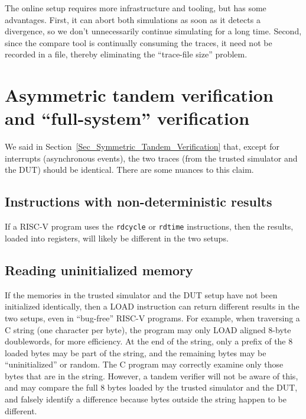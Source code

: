 The online setup requires more infrastructure and tooling, but has
some advantages.  First, it can abort both simulations as soon as it
detects a divergence, so we don't unnecessarily continue simulating
for a long time.  Second, since the compare tool is continually
consuming the traces, it need not be recorded in a file, thereby
eliminating the ``trace-file size'' problem.


\section{Asymmetric tandem verification and ``full-system'' verification}

\label{Sec_Asymmetric_Tandem_Verification}

We said in Section~\ref{Sec_Symmetric_Tandem_Verification} that,
except for interrupts (asynchronous events), the two traces (from the
trusted simulator and the DUT) should be identical.  There are some
nuances to this claim.


\subsection{Instructions with non-deterministic results}

If a RISC-V program uses the \verb|rdcycle| or \verb|rdtime|
instructions, then the results, loaded into registers, will likely be
different in the two setups.


\subsection{Reading uninitialized memory}

If the memories in the trusted simulator and the DUT setup have not
been initialized identically, then a LOAD instruction can return
different results in the two setups, even in ``bug-free'' RISC-V
programs.  For example, when traversing a C string (one character per
byte), the program may only LOAD aligned 8-byte doublewords, for more
efficiency. At the end of the string, only a prefix of the 8 loaded
bytes may be part of the string, and the remaining bytes may be
``uninitialized'' or random.  The C program may correctly examine only
those bytes that are in the string.  However, a tandem verifier will
not be aware of this, and may compare the full 8 bytes loaded by the
trusted simulator and the DUT, and falsely identify a difference
because bytes outside the string happen to be different.

